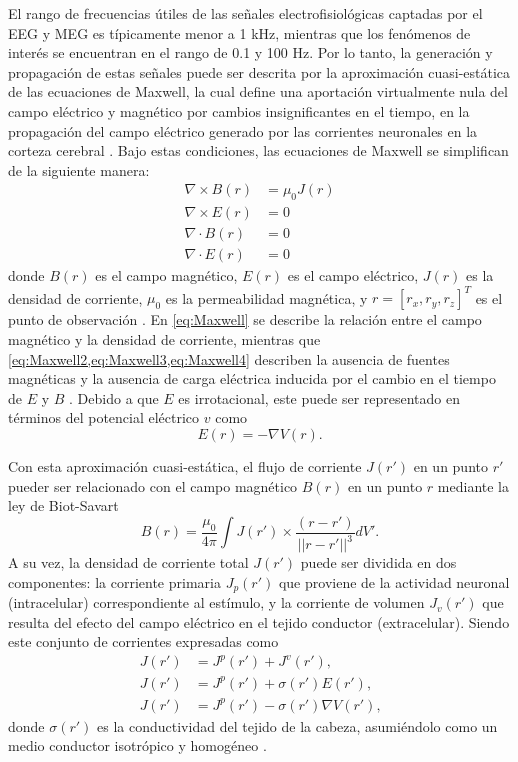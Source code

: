 El rango de frecuencias útiles de las señales electrofisiológicas captadas por el EEG y MEG es típicamente menor a 1 kHz, mientras que los fenómenos de interés se encuentran en el rango de 0.1 y 100 Hz.
Por lo tanto, la generación y propagación de estas señales puede ser descrita por la aproximación cuasi-estática de las ecuaciones de Maxwell, la cual define una aportación virtualmente nula del campo eléctrico y magnético por cambios insignificantes en el tiempo, en la propagación del campo eléctrico generado por las corrientes neuronales en la corteza cerebral \cite{Hamalainen1993, Plonsey1967}.
Bajo estas condiciones, las ecuaciones de Maxwell se simplifican de la siguiente manera:
\begin{align}
	\nabla \times B(r) & = \mu_{0} J (r) \label{eq:Maxwell} \\
	\nabla \times E(r) & = 0 \label{eq:Maxwell2}            \\
	\nabla \cdot B(r)  & = 0 \label{eq:Maxwell3}            \\
	\nabla \cdot E(r)  & = 0 \label{eq:Maxwell4}
\end{align}
donde $B(r)$ es el campo magnético, $E(r)$ es el campo eléctrico, $J(r)$ es la densidad de corriente, $\mu_{0}$ es la permeabilidad magnética, y $r = [r_x, r_y, r_z]^T$ es el punto de observación \cite{Gutierrez2008}.
En \cref{eq:Maxwell} se describe la relación entre el campo magnético y la densidad de corriente, mientras que \cref{eq:Maxwell2,eq:Maxwell3,eq:Maxwell4} describen la ausencia de fuentes magnéticas y la ausencia de carga eléctrica inducida por el cambio en el tiempo de $E$ y $B$ \cite{Hamalainen1993}.
Debido a que $E$ es irrotacional, este puede ser representado en términos del potencial eléctrico $v$ como
\begin{equation}
	E(r) = -\nabla V(r)\text{.} \label{eq:potencial}
\end{equation}

Con esta aproximación cuasi-estática, el flujo de corriente $J(r')$ en un punto $r'$ pueder ser relacionado con el campo magnético $B(r)$ en un punto $r$ mediante la ley de Biot-Savart
\begin{equation}
	B(r) = \frac{\mu_{0}}{4\pi} \int J(r') \times \frac{(r - r')}{||r - r'||^3} dV'\text{.} \label{eq:biot-savart}
\end{equation}
A su vez, la densidad de corriente total $J(r')$ puede ser dividida en dos componentes: la corriente primaria $J_{p}(r')$ que proviene de la actividad neuronal (intracelular) correspondiente al estímulo, y la corriente de volumen $J_{v}(r')$ que resulta del efecto del campo eléctrico en el tejido conductor (extracelular).
Siendo este conjunto de corrientes expresadas como
\begin{align}
	J(r') & = J^{p}(r') + J^{v}(r')\text{,} \label{eq:corriente1}               \\
	J(r') & = J^{p}(r') + \sigma(r') E(r')\text{,} \label{eq:corriente2}        \\
	J(r') & = J^{p}(r') - \sigma(r') \nabla V(r')\text{,} \label{eq:corriente3}
\end{align}
donde $\sigma(r')$ es la conductividad del tejido de la cabeza, asumiéndolo como un medio conductor isotrópico y homogéneo \cite{Baillet2001, Gutierrez2008}.


